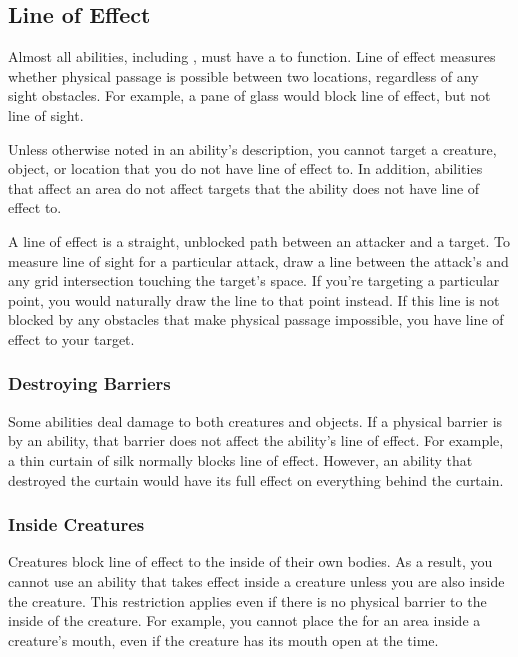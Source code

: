     \subsection{Line of Effect}\label{Line of Effect}
        Almost all abilities, including , must have a  to function.
        Line of effect measures whether physical passage is possible between two locations, regardless of any sight obstacles.
        For example, a pane of glass would block line of effect, but not line of sight.

        Unless otherwise noted in an ability's description, you cannot target a creature, object, or location that you do not have line of effect to.
        In addition, abilities that affect an area do not affect targets that the ability does not have line of effect to.

        A line of effect is a straight, unblocked path between an attacker and a target.
        To measure line of sight for a particular attack, draw a line between the attack's  and any grid intersection touching the target's space.
        If you're targeting a particular point, you would naturally draw the line to that point instead.
        If this line is not blocked by any obstacles that make physical passage impossible, you have line of effect to your target.

        \subsubsection{Destroying Barriers}\label{Destroying Barriers}
            Some abilities deal damage to both creatures and objects.
            If a physical barrier is  by an ability, that barrier does not affect the ability's line of effect.
            For example, a thin curtain of silk normally blocks line of effect.
            However, an ability that destroyed the curtain would have its full effect on everything behind the curtain.

        \subsubsection{Inside Creatures}
            Creatures block line of effect to the inside of their own bodies.
            As a result, you cannot use an ability that takes effect inside a creature unless you are also inside the creature.
            This restriction applies even if there is no physical barrier to the inside of the creature.
            For example, you cannot place the  for an area inside a creature's mouth, even if the creature has its mouth open at the time.

